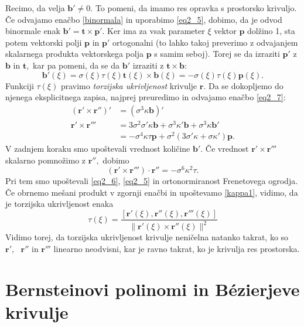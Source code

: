 \documentclass[12pt,a4paper,twoside]{article}
\theoremstyle{definition} %
\theoremstyle{plain} %
\numberwithin{equation}{section}  %
\newcommand{\tV}{\mathbf{t}}
\newcommand{\bV}{\mathbf{b}}
\newcommand{\pV}{\mathbf{p}}
\newcommand{\rV}{\mathbf{r}}
\begin{document}
Recimo, da velja $\mathbf{b'} \neq 0.$ To pomeni, da imamo res opravka s prostorsko krivuljo. Če odvajamo enačbo \eqref{binormala} in uporabimo \eqref{eq2_5}, dobimo, da je odvod binormale enak $\mathbf{b'}=\tV \times \mathbf{p'}.$ Ker ima za vsak parameter $\xi$ vektor $\pV$ dolžino 1, sta potem vektorski polji $\pV$ in $\mathbf{p'}$ ortogonalni (to lahko takoj preverimo z odvajanjem skalarnega produkta vektorskega polja $\pV$ s samim seboj). Torej se da izraziti $\mathbf{p'}$ z $\bV$ in $\tV,$ kar pa pomeni, da se da $\mathbf{b'}$ izraziti z $\tV \times \bV:$
\begin{equation}
	\label{eq2_11}
	\mathbf{b'}(\xi)=\sigma(\xi)\tau(\xi)\tV(\xi)\times \bV(\xi)=-\sigma(\xi)\tau(\xi)\pV(\xi).
\end{equation}
Funkciji $\tau(\xi)$ pravimo \textit{torzijska ukrivljenost} krivulje $\rV.$ Da se dokopljemo do njenega eksplicitnega zapisa, najprej preuredimo in odvajamo enačbo \eqref{eq2_7}:
\begin{align*}
	(\rV' \times \rV'')'&=(\sigma^3\kappa \bV)'\\
	\rV' \times \rV''' &= 3\sigma^2\sigma'\kappa\bV+\sigma^3\kappa'\bV+\sigma^3\kappa\mathbf{b'}\\
	&=-\sigma^4\kappa\tau\pV+\sigma^2(3\sigma'\kappa+\sigma\kappa')\mathbf{p.}
\end{align*}
V zadnjem koraku smo upoštevali vrednost količine $\mathbf{b'}.$ Če vrednost $\rV'\times \rV'''$ skalarno pomnožimo z $\rV'',$ dobimo
\begin{equation}
	(\rV'\times\rV''')\cdot\rV''=-\sigma^6\kappa^2\tau.
\end{equation}
Pri tem smo upoštevali \eqref{eq2_6}, \eqref{eq2_5} in ortonormiranost Frenetovega ogrodja. Če obrnemo mešani produkt v zgornji enačbi in upoštevamo \eqref{kappa1}, vidimo, da je torzijska ukrivljenost enaka
\begin{equation}
	\label{tau1}
	\tau(\xi)=\frac{[\rV'(\xi), \rV''(\xi), \rV'''(\xi)]}{\lVert \rV'(\xi)\times \rV''(\xi) \rVert^2}
\end{equation}
Vidimo torej, da torzijska ukrivljenost krivulje neničelna natanko takrat, ko so $\rV', \text{ } \rV''$ in $\rV'''$ linearno neodvisni, kar je ravno takrat, ko je krivulja res prostorska.
\section{Bernsteinovi polinomi in Bézierjeve krivulje}
\end{document}
